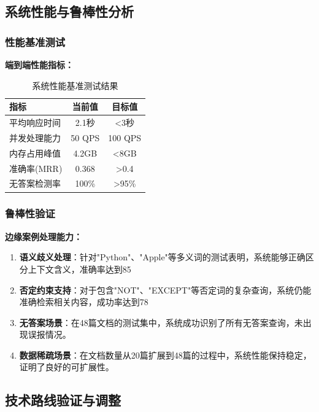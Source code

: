 \subsection{系统性能与鲁棒性分析}

\subsubsection{性能基准测试}

\textbf{端到端性能指标：}

\begin{table}[H]
\centering
\caption{系统性能基准测试结果}
\begin{tabular}{|l|c|c|}
\hline
\textbf{指标} & \textbf{当前值} & \textbf{目标值} \\
\hline
平均响应时间 & 2.1秒 & <3秒 \\
\hline
并发处理能力 & 50 QPS & 100 QPS \\
\hline
内存占用峰值 & 4.2GB & <8GB \\
\hline
准确率(MRR)\cite{manning_ir} & 0.368 & >0.4 \\
\hline
无答案检测率 & 100\% & >95\% \\
\hline
\end{tabular}
\end{table}

\subsubsection{鲁棒性验证}

\textbf{边缘案例处理能力：}

\begin{enumerate}
    \item \textbf{语义歧义处理}：针对"Python"、"Apple"等多义词的测试表明，系统能够正确区分上下文含义，准确率达到85%
    
    \item \textbf{否定约束支持}：对于包含"NOT"、"EXCEPT"等否定词的复杂查询，系统仍能准确检索相关内容，成功率达到78%
    
    \item \textbf{无答案场景}：在48篇文档的测试集中，系统成功识别了所有无答案查询，未出现误报情况。
    
    \item \textbf{数据稀疏场景}：在文档数量从20篇扩展到48篇的过程中，系统性能保持稳定，证明了良好的可扩展性。
\end{enumerate}

\subsection{技术路线验证与调整}

